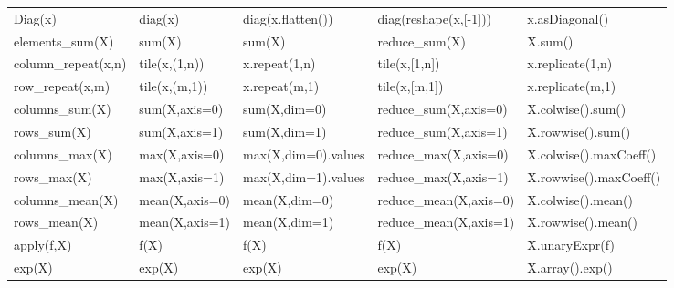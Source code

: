 \documentclass{article}
\begin{document}
\begin{table}[htb]
\begin{tabular}{ p{2.2cm}|p{2.6cm}p{2.6cm}p{2.6cm}p{3.6cm} }
\textsf{Diag(x)}               & \textsf{diag(x)}                & \textsf{diag(x.flatten())}       & \textsf{diag(reshape(x,[-1]))}       & \textsf{x.asDiagonal()}                  \\
\textsf{elements\_sum(X)}      & \textsf{sum(X)}                 & \textsf{sum(X)}                  & \textsf{reduce\_sum(X)}              & \textsf{X.sum()}                         \\
\textsf{column\_repeat(x,n)}   & \textsf{tile(x,(1,n))}          & \textsf{x.repeat(1,n)}           & \textsf{tile(x,[1,n])}               & \textsf{x.replicate(1,n)}               \\
\textsf{row\_repeat(x,m)}      & \textsf{tile(x,(m,1))}          & \textsf{x.repeat(m,1)}           & \textsf{tile(x,[m,1])}               & \textsf{x.replicate(m,1)}               \\
\textsf{columns\_sum(X)}       & \textsf{sum(X,axis=0)}          & \textsf{sum(X,dim=0)}            & \textsf{reduce\_sum(X,axis=0)}       & \textsf{X.colwise().sum()}               \\
\textsf{rows\_sum(X)}          & \textsf{sum(X,axis=1)}          & \textsf{sum(X,dim=1)}            & \textsf{reduce\_sum(X,axis=1)}       & \textsf{X.rowwise().sum()}               \\
\textsf{columns\_max(X)}       & \textsf{max(X,axis=0)}          & \textsf{max(X,dim=0).values}     & \textsf{reduce\_max(X,axis=0)}       & \textsf{X.colwise().maxCoeff()}          \\
\textsf{rows\_max(X)}          & \textsf{max(X,axis=1)}          & \textsf{max(X,dim=1).values}     & \textsf{reduce\_max(X,axis=1)}       & \textsf{X.rowwise().maxCoeff()}          \\
\textsf{columns\_mean(X)}      & \textsf{mean(X,axis=0)}         & \textsf{mean(X,dim=0)}           & \textsf{reduce\_mean(X,axis=0)}      & \textsf{X.colwise().mean()}              \\
\textsf{rows\_mean(X)}         & \textsf{mean(X,axis=1)}         & \textsf{mean(X,dim=1)}           & \textsf{reduce\_mean(X,axis=1)}      & \textsf{X.rowwise().mean()}              \\
\textsf{apply(f,X)}            & \textsf{f(X)}                   & \textsf{f(X)}                    & \textsf{f(X)}                        & \textsf{X.unaryExpr(f)}                  \\
\textsf{exp(X)}                & \textsf{exp(X)}                 & \textsf{exp(X)}                  & \textsf{exp(X)}                      & \textsf{X.array().exp()}                 \\

\end{tabular}
\end{table}
\end{document}
